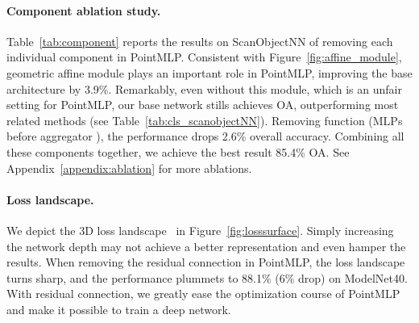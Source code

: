 \documentclass{article} \usepackage{iclr2022_conference,times}
\begin{document}
\paragraph{Component ablation study.} Table~\ref{tab:component} reports the results on ScanObjectNN of removing each individual component in PointMLP. Consistent with Figure~\ref{fig:affine_module}, geometric affine module plays an important role in PointMLP,
improving the base architecture by 3.9\%. Remarkably, even without this module, which is an unfair setting for PointMLP,  our base network stills achieves  OA, outperforming most related methods (see Table~\ref{tab:cls_scanobjectNN}).
Removing  function (MLPs before aggregator ), the performance drops 2.6\% overall accuracy. Combining all these components together, we achieve the best result 85.4\% OA. See Appendix~\ref{appendix:ablation} for more ablations.


\paragraph{Loss landscape.} We depict the 3D loss landscape~\citep{li2018visualizing} in Figure~\ref{fig:losssurface}. Simply increasing the network depth may not achieve a better representation and even hamper the results. When removing the residual connection in PointMLP, the loss landscape turns sharp, and the performance plummets to 88.1\% (6\% drop) on ModelNet40. With residual connection, we greatly ease the optimization course of PointMLP and make it possible to train a deep network.


         
         
\end{document}
